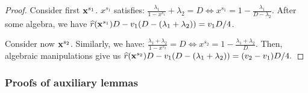 \documentclass[12pt]{article}
\begin{document}
\begin{proof}
Consider first $\mathbf{x}^{s_1}$. $x^{s_1}$ satisfies:
    $\frac{\lambda_1}{1-x^{s_1}} + \lambda_2 = D \iff x^{s_1} = 1 - \frac{\lambda_1}{D-\lambda_2}.$
After some algebra, we have $ \widehat{r}(\mathbf{x}^{s_1})D-v_1(D-(\lambda_1 + \lambda_2)) = v_1D/4$.

Consider now $\mathbf{x}^{s_2}$. Similarly, we have:
$    \frac{\lambda_1 + \lambda_2}{1-x^{s_2}} = D \iff x^{s_2} = 1-\frac{\lambda_1 + \lambda_2}{D}.$
Then, algebraic manipulations give us $ \widehat{r}(\mathbf{x}^{s_2})D-v_1(D-(\lambda_1 + \lambda_2)) = (v_2-v_1)D/4.$
\end{proof}

 

\subsubsection{Proofs of auxiliary lemmas}\label{apx:aux-lemmas-belief-based}
\end{document}

